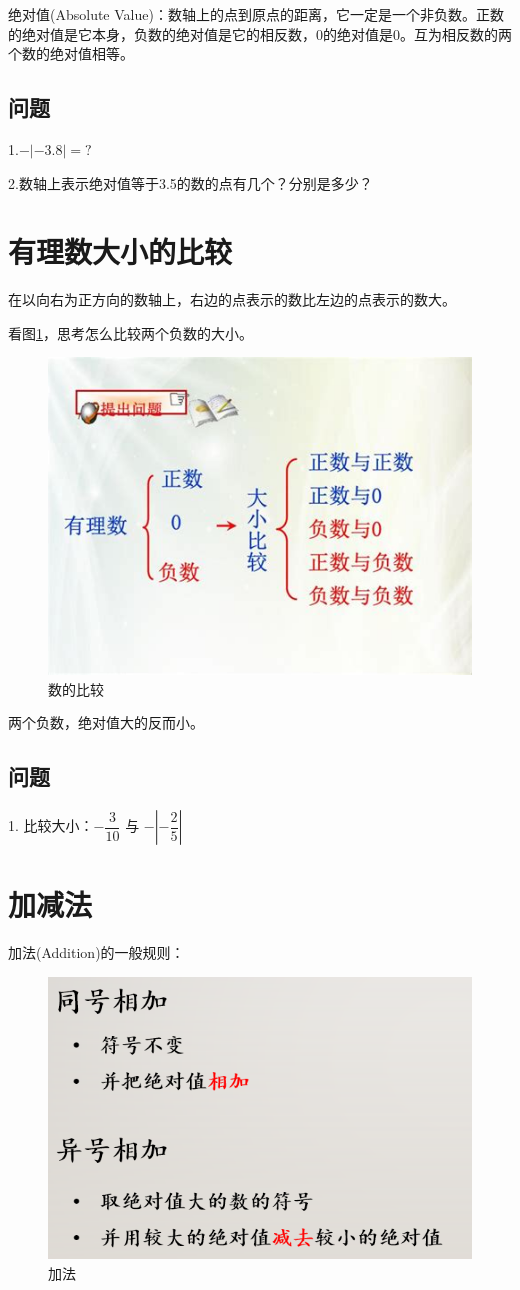\documentclass[UTF8,12pt]{ctexart}
\begin{document}
绝对值(Absolute Value)：数轴上的点到原点的距离，它一定是一个非负数。正数的绝对值是它本身，负数的绝对值是它的相反数，0的绝对值是0。互为相反数的两个数的绝对值相等。

\subsection{问题}
1.\quad $ -|-3.8| = ? $

2.\quad 数轴上表示绝对值等于3.5的数的点有几个？分别是多少？

\newpage
\section{有理数大小的比较}

在以向右为正方向的数轴上，右边的点表示的数比左边的点表示的数大。

看图\ref{fig:number-comparison}，思考怎么比较两个负数的大小。

\begin{figure}[htb]
\centering
\includegraphics[width = .55\textwidth]{number-comparison.jpg}
\caption{数的比较}
\label{fig:number-comparison}
\end{figure}

两个负数，绝对值大的反而小。

\subsection{问题}
1. \quad 比较大小：$ -\dfrac{3}{10} $ 与 $ -|-\dfrac{2}{5}| $

\newpage
\section{加减法}

加法(Addition)的一般规则：
\begin{figure}[htb]
\centering
\includegraphics[width = .55\textwidth]{addition.png}
\caption{加法}
\label{fig:addtion}
\end{figure}
\end{document}
